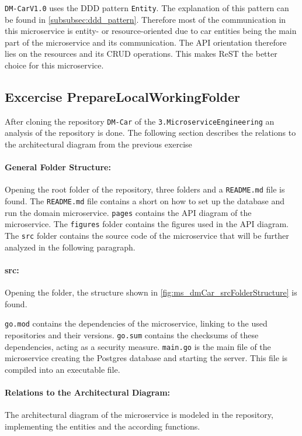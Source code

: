 \texttt{DM-CarV1.0} uses the DDD pattern \texttt{Entity}.
The explanation of this pattern can be found in \autoref{subsubsec:ddd_pattern}.
Therefore most of the communication in this microservice is entity- or resource-oriented due to car entities being the main part of the microservice and its communication.
The API orientation therefore lies on the resources and its CRUD operations.
This makes ReST the better choice for this microservice.

\subsection{Excercise PrepareLocalWorkingFolder}
\label{subsec:prepare_local_working_folder}
After cloning the repository \texttt{DM-Car} of the \texttt{3.MicroserviceEngineering} an analysis of the repository is done.
The following section describes the relations to the architectural diagram from the previous exercise 

\paragraph*{General Folder Structure:}
Opening the root folder of the repository, three folders and a \texttt{README.md} file is found.
The \texttt{README.md} file contains a short on how to set up the database and run the domain microservice.
\texttt{pages} contains the API diagram of the microservice.
The \texttt{figures} folder contains the figures used in the API diagram. 
The \texttt{src} folder contains the source code of the microservice that will be further analyzed in the following paragraph.

\paragraph*{src:}
Opening the folder, the structure shown in \autoref{fig:ms_dmCar_srcFolderStructure} is found.

\texttt{go.mod} contains the dependencies of the microservice, linking to the used repositories and their versions.
\texttt{go.sum} contains the checksums of these dependencies, acting as a security measure.
\texttt{main.go} is the main file of the microservice creating the Postgres database and starting the server.
This file is compiled into an executable file.

\paragraph*{Relations to the Architectural Diagram:}
The architectural diagram of the microservice is modeled in the repository, implementing the entities and the according functions.

